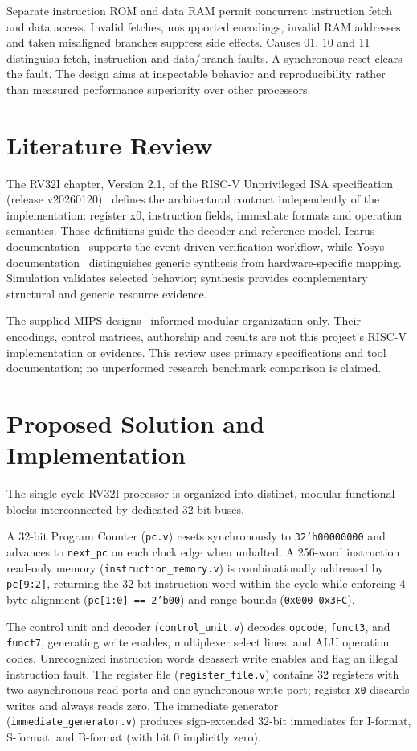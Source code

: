 \documentclass[conference,a4paper]{IEEEtran}
\begin{document}
Separate instruction ROM and data RAM permit concurrent instruction fetch and
data access. Invalid fetches, unsupported encodings, invalid RAM addresses and
taken misaligned branches suppress side effects. Causes 01, 10 and 11 distinguish
fetch, instruction and data/branch faults. A synchronous reset clears the fault.
The design aims at inspectable behavior and reproducibility rather than measured
performance superiority over other processors.

\section{Literature Review}
The RV32I chapter, Version 2.1, of the RISC-V Unprivileged ISA specification
(release v20260120)~\cite{ref1} defines the architectural contract independently
of the implementation: register x0, instruction fields, immediate formats and
operation semantics. Those definitions guide the decoder and reference model.
Icarus documentation~\cite{ref2} supports the event-driven verification workflow,
while Yosys documentation~\cite{ref3} distinguishes generic synthesis from
hardware-specific mapping. Simulation validates selected behavior; synthesis
provides complementary structural and generic resource evidence.

The supplied MIPS designs~\cite{ref4} informed modular organization only.
Their encodings, control matrices, authorship and results are not this project's
RISC-V implementation or evidence. This review uses primary specifications and
tool documentation; no unperformed research benchmark comparison is claimed.

\section{Proposed Solution and Implementation}
The single-cycle RV32I processor is organized into distinct, modular functional blocks interconnected by dedicated 32-bit buses.

A 32-bit Program Counter (\texttt{pc.v}) resets synchronously to \texttt{32'h00000000} and advances to \texttt{next\_pc} on each clock edge when unhalted. A 256-word instruction read-only memory (\texttt{instruction\_memory.v}) is combinationally addressed by \texttt{pc[9:2]}, returning the 32-bit instruction word within the cycle while enforcing 4-byte alignment (\texttt{pc[1:0] == 2'b00}) and range bounds (\texttt{0x000}--\texttt{0x3FC}).

The control unit and decoder (\texttt{control\_unit.v}) decodes \texttt{opcode}, \texttt{funct3}, and \texttt{funct7}, generating write enables, multiplexer select lines, and ALU operation codes. Unrecognized instruction words deassert write enables and flag an illegal instruction fault. The register file (\texttt{register\_file.v}) contains 32 registers with two asynchronous read ports and one synchronous write port; register \texttt{x0} discards writes and always reads zero. The immediate generator (\texttt{immediate\_generator.v}) produces sign-extended 32-bit immediates for I-format, S-format, and B-format (with bit 0 implicitly zero).
\end{document}
